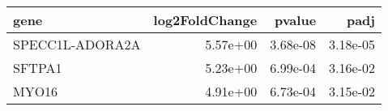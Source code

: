 \begin{tabular}{lrrr}
\toprule
           gene &  log2FoldChange &   pvalue &     padj \\
\midrule
SPECC1L-ADORA2A &        5.57e+00 & 3.68e-08 & 3.18e-05 \\
         SFTPA1 &        5.23e+00 & 6.99e-04 & 3.16e-02 \\
          MYO16 &        4.91e+00 & 6.73e-04 & 3.15e-02 \\
\bottomrule
\end{tabular}
